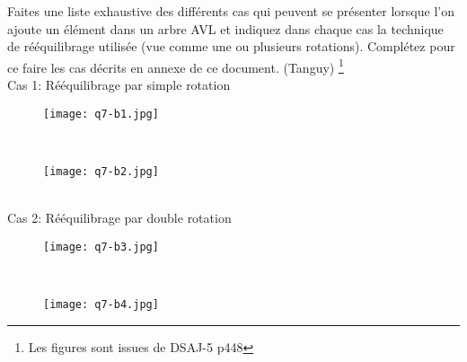 Faites une liste exhaustive des différents cas qui peuvent se présenter lorsque l’on
ajoute un élément dans un arbre AVL et indiquez dans chaque cas la technique de
rééquilibrage utilisée (vue comme une ou plusieurs rotations). Complétez pour ce
faire les cas décrits en annexe de ce document. (Tanguy) \footnote{Les figures sont issues de DSAJ-5 p448}
\\
Cas 1: Rééquilibrage par simple rotation
\begin{figure}[!h]
	\centering
	\texttt{[image: q7-b1.jpg]}
	\label{fig:equi}
\end{figure}
\\
\begin{figure}[!h]
	\centering
	\texttt{[image: q7-b2.jpg]}
	\label{fig:equi}
\end{figure}
\\
Cas 2: Rééquilibrage par double rotation
\begin{figure}[!h]
	\centering
	\texttt{[image: q7-b3.jpg]}
	\label{fig:equi}
\end{figure}
\\
\begin{figure}[!h]
	\centering
	\texttt{[image: q7-b4.jpg]}
	\label{fig:equi}
\end{figure}